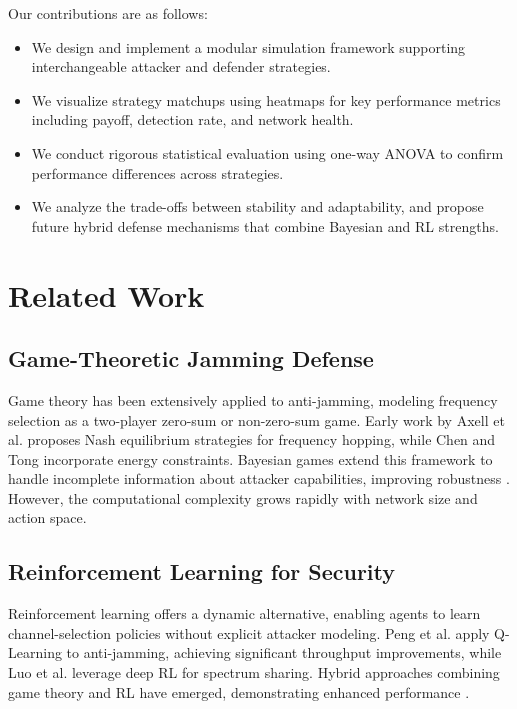\documentclass[conference]{IEEEtran}
\begin{document}
Our contributions are as follows:
\begin{itemize}
  \item We design and implement a modular simulation framework supporting interchangeable attacker and defender strategies.  
  \item We visualize strategy matchups using heatmaps for key performance metrics including payoff, detection rate, and network health.  
  \item We conduct rigorous statistical evaluation using one-way ANOVA to confirm performance differences across strategies.  
  \item We analyze the trade-offs between stability and adaptability, and propose future hybrid defense mechanisms that combine Bayesian and RL strengths.  
\end{itemize}

\section{Related Work}
\subsection{Game-Theoretic Jamming Defense}
Game theory has been extensively applied to anti-jamming, modeling frequency selection as a two-player zero-sum or non-zero-sum game. Early work by Axell et al. \cite{axell2012detection} proposes Nash equilibrium strategies for frequency hopping, while Chen and Tong \cite{chen2019anti} incorporate energy constraints. Bayesian games extend this framework to handle incomplete information about attacker capabilities, improving robustness \cite{alpcan2007game,khouzani2012evolving}. However, the computational complexity grows rapidly with network size and action space.

\subsection{Reinforcement Learning for Security}
Reinforcement learning offers a dynamic alternative, enabling agents to learn channel-selection policies without explicit attacker modeling. Peng et al. \cite{peng2017anti} apply Q-Learning to anti-jamming, achieving significant throughput improvements, while Luo et al. \cite{luo2018anti} leverage deep RL for spectrum sharing. Hybrid approaches combining game theory and RL have emerged, demonstrating enhanced performance \cite{zhao2020hybrid,li2021game}.
\end{document}
